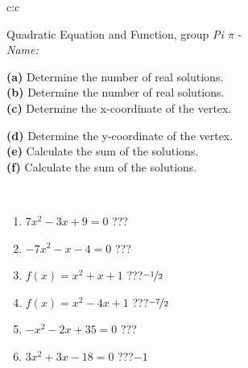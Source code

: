 \documentclass[10pt]{report}
\begin{document}
\begin{tabular}{c:c}
\begin{minipage}[c][104.5mm][t]{0.5\linewidth}
\begin{center}
\vspace{7mm}
{\huge {\LARGE Quadratic Equation and Function}, group \textit{Pi $\pi$} -}\\[5mm]
\textit{Name:}\phantom{xxxxxxxxxxxxxxxxxxxxxxxxxxxxxxxxxxxxxxxxxxxxxxxxxxxxxxxxxxxxxxxxx}\\[5mm]
\begin{minipage}{0.95\linewidth}
\begin{center}
{\small \begin{minipage}{0.5\textwidth}
\textbf{(a)} Determine the number of real solutions. \\[1mm]
\textbf{(b)} Determine the number of real solutions. \\[1mm]
\textbf{(c)} Determine the x-coordinate of the vertex.
\end{minipage} \begin{minipage}{0.49\textwidth}
\textbf{(d)} Determine the y-coordinate of the vertex. \\[1mm]
\textbf{(e)} Calculate the sum of the solutions. \\[1mm]
\textbf{(f)} Calculate the sum of the solutions.
\end{minipage}
}
\end{center}
\end{minipage}
\\[4mm]
\begin{minipage}{0.79\linewidth}
\begin{center}
\begin{varwidth}{\linewidth}
\begin{enumerate}
\Large
\item $7x^2-3x+9=0$\quad \dotfill\; ???\;\dotfill {}
\item $-7x^2-x-4=0$\quad \dotfill\; ???\;\dotfill {}
\item $f(x)=x^2+x+1$\quad \dotfill\; ???\;\dotfill \quad $\nicefrac{-1}{2}$
\item $f(x)=x^2-4x+1$\quad \dotfill\; ???\;\dotfill \quad $\nicefrac{-7}{2}$
\item $-x^2-2x+35=0$\quad \dotfill\; ???\;\dotfill {}
\item $3x^2+3x-18=0$\quad \dotfill\; ???\;\dotfill \quad $-1$
\end{enumerate}
\end{varwidth}
\end{center}

\end{minipage}
\end{center}
\end{minipage}
\end{tabular}
\end{document}
